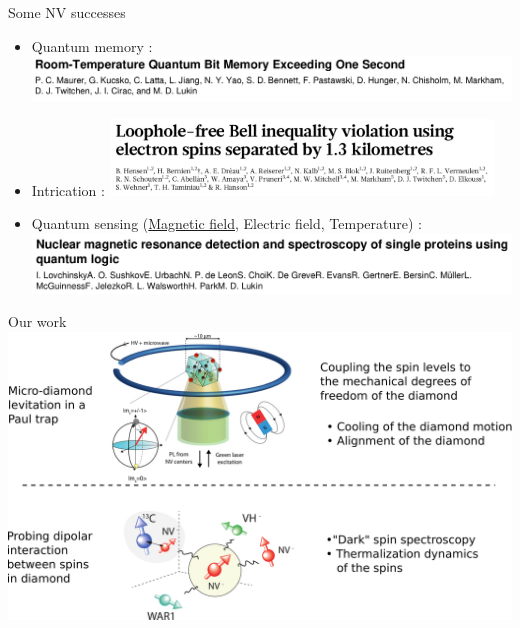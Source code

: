 \documentclass{beamer}
\begin{document}
\begin{frame}{Some NV successes}
\begin{itemize}
\item Quantum memory :
\includegraphics[width=\textwidth,height=0.9\textheight,keepaspectratio]{quantum_memory}
\item Intrication :
\includegraphics[width=0.8\textwidth,height=0.9\textheight,keepaspectratio]{intrication}
\item Quantum sensing (\underline{Magnetic field}, Electric field, Temperature) :
\includegraphics[width=\textwidth,height=0.9\textheight,keepaspectratio]{sensing}
\end{itemize}
\end{frame}
\begin{frame}{Our work}
\centering
\includegraphics[width=\textwidth,height=0.9\textheight,keepaspectratio]{Slide our work}
\end{frame}
\end{document}
